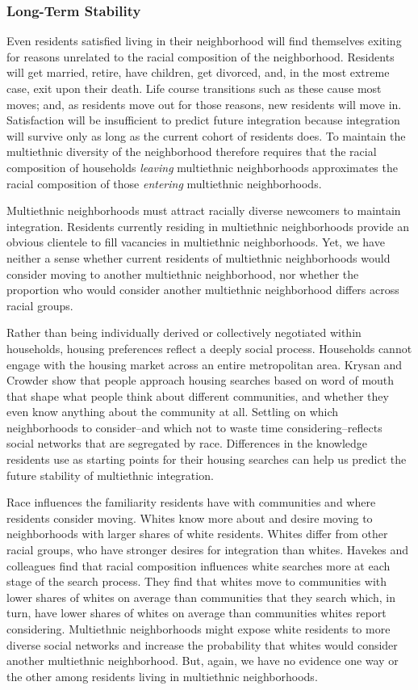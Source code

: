 \documentclass[]{article}
\theoremstyle{definition}
\theoremstyle{definition}
\theoremstyle{definition}
\theoremstyle{remark}
\begin{document}
\subsubsection{Long-Term Stability}\label{long-term-stability}

Even residents satisfied living in their neighborhood will find
themselves exiting for reasons unrelated to the racial composition of
the neighborhood. Residents will get married, retire, have children, get
divorced, and, in the most extreme case, exit upon their death. Life
course transitions such as these cause most moves; and, as residents
move out for those reasons, new residents will move in. Satisfaction
will be insufficient to predict future integration because integration
will survive only as long as the current cohort of residents does. To
maintain the multiethnic diversity of the neighborhood therefore
requires that the racial composition of households \emph{leaving}
multiethnic neighborhoods approximates the racial composition of those
\emph{entering} multiethnic neighborhoods.

Multiethnic neighborhoods must attract racially diverse newcomers to
maintain integration. Residents currently residing in multiethnic
neighborhoods provide an obvious clientele to fill vacancies in
multiethnic neighborhoods. Yet, we have neither a sense whether current
residents of multiethnic neighborhoods would consider moving to another
multiethnic neighborhood, nor whether the proportion who would consider
another multiethnic neighborhood differs across racial groups.

Rather than being individually derived or collectively negotiated within
households, housing preferences reflect a deeply social process.
Households cannot engage with the housing market across an entire
metropolitan area. Krysan and Crowder show that people approach housing
searches based on word of mouth that shape what people think about
different communities, and whether they even know anything about the
community at all. Settling on which neighborhoods to consider--and which
not to waste time considering--reflects social networks that are
segregated by race. Differences in the knowledge residents use as
starting points for their housing searches can help us predict the
future stability of multiethnic integration.

Race influences the familiarity residents have with communities and
where residents consider moving. Whites know more about and desire
moving to neighborhoods with larger shares of white residents. Whites
differ from other racial groups, who have stronger desires for
integration than whites. Havekes and colleagues find that racial
composition influences white searches more at each stage of the search
process. They find that whites move to communities with lower shares of
whites on average than communities that they search which, in turn, have
lower shares of whites on average than communities whites report
considering. Multiethnic neighborhoods might expose white residents to
more diverse social networks and increase the probability that whites
would consider another multiethnic neighborhood. But, again, we have no
evidence one way or the other among residents living in multiethnic
neighborhoods.
\end{document}
